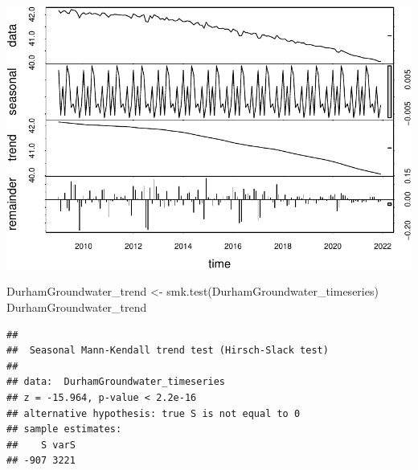 \documentclass[
  12pt,
]{article}
\newenvironment{Shaded}{\begin{snugshade}}{\end{snugshade}}
\newcommand{\AttributeTok}[1]{\textcolor[rgb]{0.77,0.63,0.00}{#1}}
\newcommand{\DecValTok}[1]{\textcolor[rgb]{0.00,0.00,0.81}{#1}}
\newcommand{\FunctionTok}[1]{\textcolor[rgb]{0.00,0.00,0.00}{#1}}
\newcommand{\NormalTok}[1]{#1}
\newcommand{\OtherTok}[1]{\textcolor[rgb]{0.56,0.35,0.01}{#1}}
\newcommand{\SpecialCharTok}[1]{\textcolor[rgb]{0.00,0.00,0.00}{#1}}
\newcommand{\StringTok}[1]{\textcolor[rgb]{0.31,0.60,0.02}{#1}}
\begin{document}
\begin{Shaded}
\end{Shaded}

\includegraphics{Project_files/figure-latex/time-series analysis on groundwater-1.pdf}

\begin{Shaded}
\begin{Highlighting}[]
\NormalTok{DurhamGroundwater\_trend }\OtherTok{\textless{}{-}} \FunctionTok{smk.test}\NormalTok{(DurhamGroundwater\_timeseries)}
\NormalTok{DurhamGroundwater\_trend}
\end{Highlighting}
\end{Shaded}

\begin{verbatim}
## 
##  Seasonal Mann-Kendall trend test (Hirsch-Slack test)
## 
## data:  DurhamGroundwater_timeseries
## z = -15.964, p-value < 2.2e-16
## alternative hypothesis: true S is not equal to 0
## sample estimates:
##    S varS 
## -907 3221
\end{verbatim}
\end{document}
